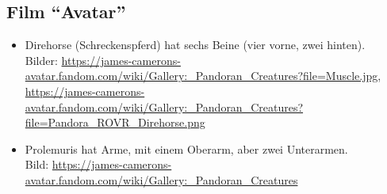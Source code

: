 \subsection{Film "`Avatar"'}

\begin{itemize}
 \item Direhorse (Schreckenspferd) hat sechs Beine (vier vorne, zwei hinten).\\
 Bilder: \url{https://james-camerons-avatar.fandom.com/wiki/Gallery:_Pandoran_Creatures?file=Muscle.jpg}, \url{https://james-camerons-avatar.fandom.com/wiki/Gallery:_Pandoran_Creatures?file=Pandora_ROVR_Direhorse.png}
 \item Prolemuris hat Arme, mit einem Oberarm, aber zwei Unterarmen.\\
 Bild: \url{https://james-camerons-avatar.fandom.com/wiki/Gallery:_Pandoran_Creatures}
\end{itemize}

